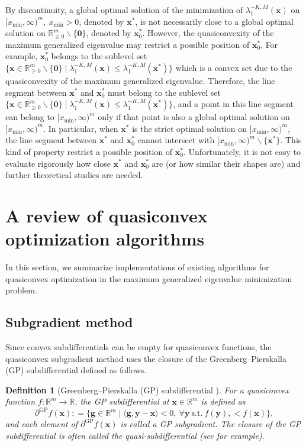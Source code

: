 \documentclass[sn-mathphys,Numbered]{sn-jnl}%
\theoremstyle{thmstyleone}%
\theoremstyle{thmstyletwo}%
\theoremstyle{thmstylethree}%
\newtheorem{definition}{Definition}%
\newcommand{\e}[1]{\begin{equation}#1\end{equation}}
\def\coloneq{\mathrel{\mathop:}=}
\def\rm{\mathbb{R}^m}
\def\gpartial{\partial^\mathrm{GP}}
\begin{document}
\begin{appendices}
By discontinuity, a global optimal solution of the minimization of $\lambda^{-K,M}_1(\bm{x})$ on $[x_{\mathrm{min}},\infty)^m,\ x_{\mathrm{min}}>0$, denoted by $\bm{x}^{*}$, is not necessarily close to a global optimal solution on $\rm_{\ge 0}\backslash\{\bm{0}\}$, denoted by $\bm{x}^{*}_0$. However, the quasiconvexity of the maximum generalized eigenvalue may restrict a possible position of $\bm{x}^{*}_0$. For example, $\bm{x}^{*}_0$ belongs to the sublevel set $\{\bm{x}\in\rm_{\ge 0}\backslash\{\bm{0}\}\mid\lambda^{-K,M}_1(\bm{x})\le\lambda_1^{-K,M}(\bm{x}^*)\}$ which is a convex set due to the quasiconvexity of the maximum generalized eigenvalue. Therefore, the line segment between $\bm{x}^{*}$ and $\bm{x}^{*}_0$ must belong to the sublevel set $\{\bm{x}\in\rm_{\ge 0}\backslash\{\bm{0}\}\mid\lambda^{-K,M}_1(\bm{x})\le\lambda_1^{-K,M}(\bm{x}^*)\}$, and a point in this line segment can belong to $[x_{\mathrm{min}},\infty)^m$ only if that point is also a global optimal solution on $[x_{\mathrm{min}},\infty)^m$. In particular, when $\bm{x}^{*}$ is the strict optimal solution on $[x_{\mathrm{min}},\infty)^m$, the line segment between $\bm{x}^{*}$ and $\bm{x}^{*}_0$ cannot intersect with $[x_{\mathrm{min}},\infty)^m\backslash\{\bm{x}^{*}\}$. This kind of property restrict a possible position of $\bm{x}^{*}_0$. Unfortunately, it is not easy to evaluate rigorously how close $\bm{x}^{*}$ and $\bm{x}^{*}_0$ are (or how similar their shapes are) and further theoretical studies are needed.

\section{A review of quasiconvex optimization algorithms}

In this section, we summarize implementations of existing algorithms for quasiconvex optimization in the maximum generalized eigenvalue minimization problem.

\subsection{Subgradient method}
\label{a_sub}

Since convex subdifferentials can be empty for quasiconvex functions, the quasiconvex subgradient method \cite{kiwiel01,konnov03,hu15} uses the closure of the Greenberg--Pierskalla (GP) subdifferential defined as follows.

\begin{definition}[Greenberg--Pierskalla (GP) subdifferential \cite{greenberg73}]
For a quasiconvex function $f:\rm\to\mathbb{R}$, the GP subdifferential at $\bm{x}\in\rm$ is defined as
\e{
\gpartial f(\bm{x})\coloneq\{\bm{g}\in\rm \mid \langle \bm{g},\bm{y}-\bm{x}\rangle <0,\ \forall\bm{y}\ \mathrm{s.t.}\ f(\bm{y}),<f(\bm{x})\},
\label{qcsub}
}
and each element of $\gpartial f(\bm{x})$ is called a GP subgradient. The closure of the GP subdifferential is often called the quasi-subdifferential (see \cite{hu15} for example).
\end{definition}


\end{appendices}
\end{document}
